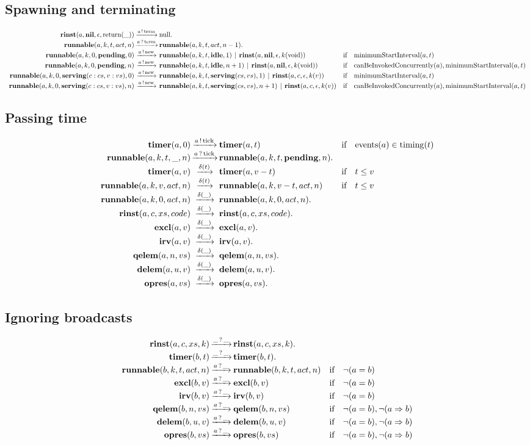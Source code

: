 \documentclass[twocolumn]{article}
\begin{document}
\subsection{Spawning and terminating}
\[ \begin{array}{r@{}c@{}lcl}    \SpawnTerminate          \end{array} \]
\subsection{Passing time}
\[ \begin{array}{r@{}c@{}lcl}    \PassingTime             \end{array} \]
\subsection{Ignoring broadcasts}
\[ \begin{array}{r@{}c@{}lcl}    \IgnoreBroadcast         \end{array} \]
\end{document}
